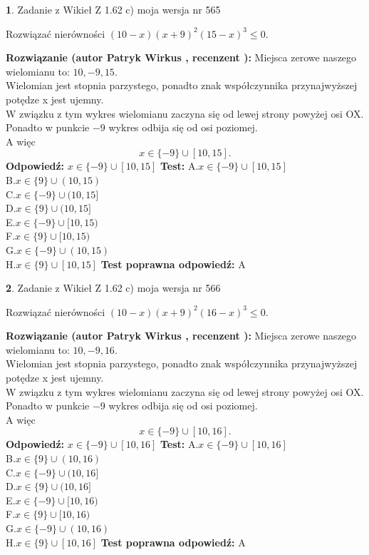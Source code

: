 \documentclass[12pt, a4paper]{article}
\theoremstyle{definition} %
\newtheorem{zad}{}
\newcommand{\zadStart}[1]{\begin{zad}#1\newline}
\newcommand{\zadStop}{\end{zad}}
\newcommand{\rozwStart}[2]{\noindent \textbf{Rozwiązanie (autor #1 , recenzent #2): }\newline}
\newcommand{\rozwStop}{\newline}
\newcommand{\odpStart}{\noindent \textbf{Odpowiedź:}\newline}
\newcommand{\odpStop}{\newline}
\newcommand{\testStart}{\noindent \textbf{Test:}\newline}
\newcommand{\testStop}{\newline}
\newcommand{\kluczStart}{\noindent \textbf{Test poprawna odpowiedź:}\newline}
\newcommand{\kluczStop}{\newline}
\begin{document}
\zadStart{Zadanie z Wikieł Z 1.62 c) moja wersja nr 565}

Rozwiązać nierówności $(10-x)(x+9)^{2}(15-x)^{3}\le0$.
\zadStop
\rozwStart{Patryk Wirkus}{}
Miejsca zerowe naszego wielomianu to: $10, -9, 15$.\\
Wielomian jest stopnia parzystego, ponadto znak współczynnika przy\linebreak najwyższej potędze x jest ujemny.\\ W związku z tym wykres wielomianu zaczyna się od lewej strony powyżej osi OX.\\
Ponadto w punkcie $-9$ wykres odbija się od osi poziomej.\\
A więc $$x \in \{-9\} \cup [10,15].$$
\rozwStop
\odpStart
$x \in \{-9\} \cup [10,15]$
\odpStop
\testStart
A.$x \in \{-9\} \cup [10,15]$\\
B.$x \in \{9\} \cup (10,15)$\\
C.$x \in \{-9\} \cup (10,15]$\\
D.$x \in \{9\} \cup (10,15]$\\
E.$x \in \{-9\} \cup [10,15)$\\
F.$x \in \{9\} \cup [10,15)$\\
G.$x \in \{-9\} \cup (10,15)$\\
H.$x \in \{9\} \cup [10,15]$
\testStop
\kluczStart
A
\kluczStop



\zadStart{Zadanie z Wikieł Z 1.62 c) moja wersja nr 566}

Rozwiązać nierówności $(10-x)(x+9)^{2}(16-x)^{3}\le0$.
\zadStop
\rozwStart{Patryk Wirkus}{}
Miejsca zerowe naszego wielomianu to: $10, -9, 16$.\\
Wielomian jest stopnia parzystego, ponadto znak współczynnika przy\linebreak najwyższej potędze x jest ujemny.\\ W związku z tym wykres wielomianu zaczyna się od lewej strony powyżej osi OX.\\
Ponadto w punkcie $-9$ wykres odbija się od osi poziomej.\\
A więc $$x \in \{-9\} \cup [10,16].$$
\rozwStop
\odpStart
$x \in \{-9\} \cup [10,16]$
\odpStop
\testStart
A.$x \in \{-9\} \cup [10,16]$\\
B.$x \in \{9\} \cup (10,16)$\\
C.$x \in \{-9\} \cup (10,16]$\\
D.$x \in \{9\} \cup (10,16]$\\
E.$x \in \{-9\} \cup [10,16)$\\
F.$x \in \{9\} \cup [10,16)$\\
G.$x \in \{-9\} \cup (10,16)$\\
H.$x \in \{9\} \cup [10,16]$
\testStop
\kluczStart
A
\kluczStop
\end{document}
